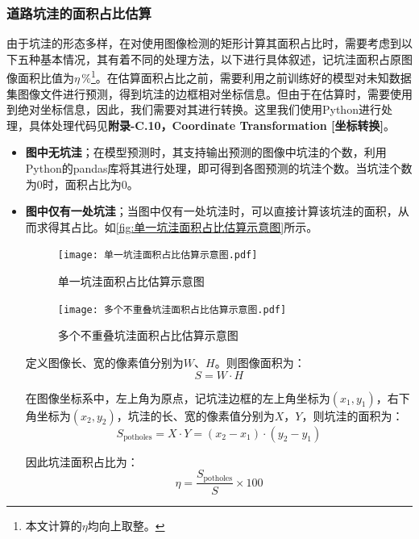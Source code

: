 \documentclass{MathorCupmodeling}
\begin{document}
	\subsubsection{道路坑洼的面积占比估算}\label{估算}
	由于坑洼的形态多样，在对使用图像检测的矩形计算其面积占比时，需要考虑到以下五种基本情况，其有着不同的处理方法，以下进行具体叙述，记坑洼面积占原图像面积比值为$\eta\,\%$\textcolor{blue}{\footnote{本文计算的$\eta$均向上取整。}}。在估算面积占比之前，需要利用之前训练好的模型对未知数据集图像文件进行预测，得到坑洼的边框相对坐标信息。但由于在估算时，需要使用到绝对坐标信息，因此，我们需要对其进行转换。这里我们使用Python进行处理，具体处理代码见\textbf{附录-C.10，Coordinate Transformation [坐标转换]}。
	\begin{itemize}
		\item \textbf{图中无坑洼}；在模型预测时，其支持输出预测的图像中坑洼的个数，利用Python的pandas库将其进行处理，即可得到各图预测的坑洼个数。当坑洼个数为0时，面积占比为0。
		\item \textbf{图中仅有一处坑洼}；当图中仅有一处坑洼时，可以直接计算该坑洼的面积，从而求得其占比。如\textcolor{blue}{\cref{fig:单一坑洼面积占比估算示意图}}所示。
		\begin{figure}[H]
			\centering
			\begin{minipage}{0.45\linewidth}
			  \centering
			  \texttt{[image: 单一坑洼面积占比估算示意图.pdf]}
			  \caption{单一坑洼面积占比估算示意图}
			  \label{fig:单一坑洼面积占比估算示意图}
			\end{minipage}
			\begin{minipage}{0.45\linewidth}
			  \centering
			  \texttt{[image: 多个不重叠坑洼面积占比估算示意图.pdf]}
			  \caption{多个不重叠坑洼面积占比估算示意图}
			  \label{fig:多个不重叠坑洼面积占比估算示意图}
			\end{minipage}
		\end{figure}
		定义图像长、宽的像素值分别为$W$、$H$。则图像面积为：
		\begin{equation}
			S=W\cdot H
		\end{equation}
		
		在图像坐标系中，左上角为原点，记坑洼边框的左上角坐标为$\left(x_1,y_1\right)$，右下角坐标为$\left(x_2,y_2\right)$，坑洼的长、宽的像素值分别为$X$，$Y$，则坑洼的面积为：
		\begin{equation}
			S_{\text{potholes}}=X\cdot Y=\left(x_2-x_1\right)\cdot\left(y_2-y_1\right)
		\end{equation}
		
		因此坑洼面积占比为：
		\begin{equation}
			\eta=\frac{S_{\text{potholes}}}{S}\times 100
		\end{equation}
		

\end{itemize}
\end{document}
